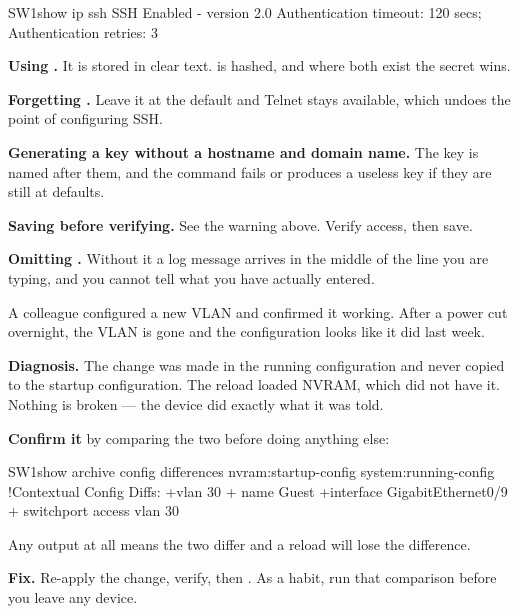 \begin{verify}{SW1}{show ip ssh}
SSH Enabled - version 2.0
Authentication timeout: 120 secs; Authentication retries: 3
\end{verify}

\begin{pitfall}
\begin{tight}
  \item \textbf{Using .} It is stored in clear text.
         is hashed, and where both exist the secret wins.
  \item \textbf{Forgetting .} Leave it at the default
        and Telnet stays available, which undoes the point of configuring SSH.
  \item \textbf{Generating a key without a hostname and domain name.} The key is
        named after them, and the command fails or produces a useless key if they
        are still at defaults.
  \item \textbf{Saving before verifying.} See the warning above. Verify access,
        then save.
  \item \textbf{Omitting .} Without it a log message
        arrives in the middle of the line you are typing, and you cannot tell
        what you have actually entered.
\end{tight}
\end{pitfall}

\begin{breakfix}
A colleague configured a new VLAN and confirmed it working. After a power cut
overnight, the VLAN is gone and the configuration looks like it did last week.

\textbf{Diagnosis.} The change was made in the running configuration and never
copied to the startup configuration. The reload loaded NVRAM, which did not have
it. Nothing is broken --- the device did exactly what it was told.

\textbf{Confirm it} by comparing the two before doing anything else:

\begin{verify}{SW1}{show archive config differences nvram:startup-config system:running-config}
!Contextual Config Diffs:
+vlan 30
+ name Guest
+interface GigabitEthernet0/9
+ switchport access vlan 30
\end{verify}

Any output at all means the two differ and a reload will lose the difference.

\textbf{Fix.} Re-apply the change, verify, then . As a habit, run that comparison before you leave any device.
\end{breakfix}

